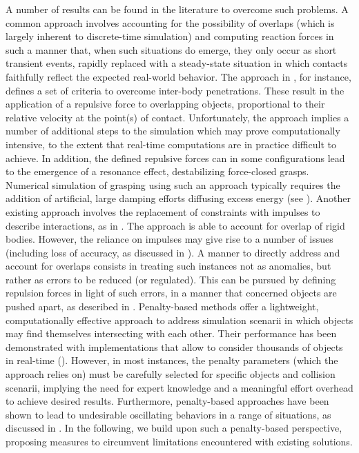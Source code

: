 \indent A number of results can be found in the literature to overcome such problems. A common approach involves accounting for the possibility of overlaps (which is largely inherent to discrete-time simulation) and computing reaction forces in such a manner that, when such situations do emerge, they only occur as short transient events, rapidly replaced with a steady-state situation in which contacts faithfully reflect the expected real-world behavior. The approach in \cite{yamane2008}, for instance, defines a set of criteria to overcome inter-body penetrations. These result in the application of a repulsive force to overlapping objects, proportional to their relative velocity at the point(s) of contact. Unfortunately, the approach implies a number of additional steps to the simulation which may prove computationally intensive, to the extent that real-time computations are in practice difficult to achieve. In addition, the defined repulsive forces can in some configurations lead to the emergence of a resonance effect, destabilizing force-closed grasps. Numerical simulation of grasping using such an approach typically requires the addition of artificial, large damping efforts diffusing excess energy (see \cite{engine_simulation}). Another existing approach involves the replacement of constraints with impulses to describe interactions, as in \cite{impulse_based}. The approach is able to account for overlap of rigid bodies. However, the reliance on impulses may give rise to a number of issues (including loss of accuracy, as discussed in \cite{impulse_based}). A manner to directly address and account for overlaps consists in treating such instances not as anomalies, but rather as errors to be reduced (or regulated). This can be pursued by defining repulsion forces in light of such errors, in a manner that concerned objects are pushed apart, as described in \cite{drumwright_penalty_based}. Penalty-based methods offer a lightweight, computationally effective approach to address simulation scenarii in which objects may find themselves intersecting with each other. Their performance has been demonstrated with implementations that allow to consider thousands of objects in real-time (\cite{sagardia_penalty}). However, in most instances, the penalty parameters (which the approach relies on) must be carefully selected for specific objects and collision scenarii, implying the need for expert knowledge and a meaningful effort overhead to achieve desired results. Furthermore, penalty-based approaches have been shown to lead to undesirable oscillating behaviors in a range of situations, as discussed in \cite{mirtich1998}. In the following, we build upon such a penalty-based perspective, proposing measures to circumvent limitations encountered with existing solutions.
